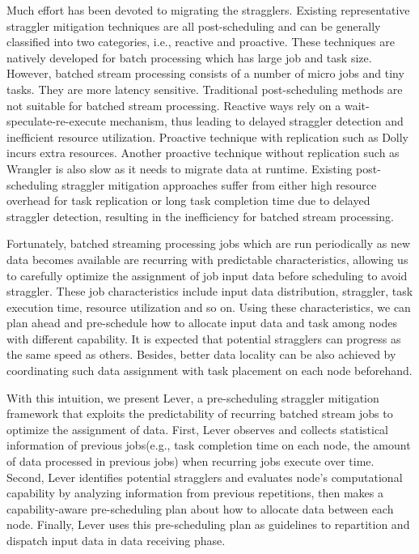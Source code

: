 \documentclass[10pt,conference,compsocconf,letterpaper]{IEEEtran}
\begin{document}
  Much effort has been devoted to migrating the stragglers. Existing representative straggler mitigation techniques are all post-scheduling and can be generally classified into two categories, i.e., reactive and proactive. These techniques are natively developed for batch processing which has large job and task size. However, batched stream processing consists of a number of micro jobs and tiny tasks. They are more latency sensitive. Traditional post-scheduling methods are not suitable for batched stream processing. Reactive ways rely on a wait-speculate-re-execute mechanism, thus leading to delayed straggler detection and inefficient resource utilization. Proactive technique with replication such as Dolly \cite{Ananthanarayanan2013} incurs extra resources. Another proactive technique without replication such as Wrangler \cite{Yadwadkar2014} is also slow as it needs to migrate data at runtime. Existing post-scheduling straggler mitigation approaches suffer from either high resource overhead for task replication or long task completion time due to delayed straggler detection, resulting in the inefficiency for batched stream processing.

  Fortunately, batched streaming processing jobs which are run periodically as new data becomes available \cite{Zaharia2013} are recurring with predictable characteristics, allowing us to carefully optimize the assignment of job input data before scheduling to avoid straggler. These job characteristics include input data distribution, straggler, task execution time, resource utilization and so on. Using these characteristics, we can plan ahead and pre-schedule how to allocate input data and task among nodes with different capability. It is expected that potential stragglers can progress as the same speed as others. Besides, better data locality can be also achieved by coordinating such data assignment with task placement on each node beforehand.

  With this intuition, we present Lever, a pre-scheduling straggler mitigation framework that exploits the predictability of recurring batched stream jobs to optimize the assignment of data. First, Lever observes and collects statistical information of previous jobs(e.g., task completion time on each node, the amount of data processed in previous jobs) when recurring jobs execute over time. Second, Lever identifies potential stragglers and evaluates node's computational capability by analyzing information from previous repetitions, then makes a capability-aware pre-scheduling plan about how to allocate data between each node. Finally, Lever uses this pre-scheduling plan as guidelines to repartition and dispatch input data in data receiving phase.
\end{document}
